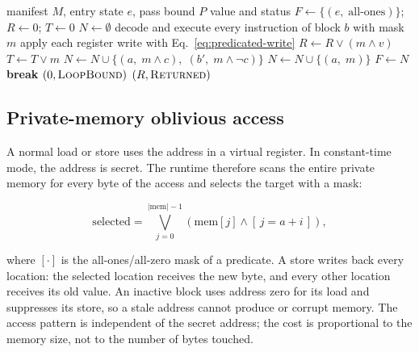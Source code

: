 \begin{algorithm}[htbp]
\caption{Fixed-pass oblivious execution.}
\label{alg:ct}
\begin{algorithmic}[1]
\REQUIRE manifest $M$, entry state $e$, pass bound $P$
\ENSURE value and status
\STATE $F \gets \{(e,\; \text{all-ones})\}$; $R \gets 0$; $T \gets 0$
  \STATE $N \gets \emptyset$
    \STATE decode and execute every instruction of block $b$ with mask $m$
    \STATE apply each register write with Eq.~\eqref{eq:predicated-write}
      \STATE $R \gets R \lor (m \land v)$
      \STATE $T \gets T \lor m$
      \STATE $N \gets N \cup \{(a,\; m \land c),\;(b',\; m \land \lnot c)\}$
      \STATE $N \gets N \cup \{(a,\; m)\}$
    \ENDIF
  \ENDFOR
  \STATE $F \gets N$
    \STATE \textbf{break}
  \ENDIF
\ENDFOR
{}
  \STATE \RETURN $(0,\textsc{LoopBound})$
\ENDIF
\STATE \RETURN $(R,\textsc{Returned})$
\end{algorithmic}
\end{algorithm}

\subsection{Private-memory oblivious access}

A normal load or store uses the address in a virtual register. In constant-time
mode, the address is secret. The runtime therefore scans the entire private
memory for every byte of the access and selects the target with a mask:

\begin{equation}
  \text{selected} = \bigvee_{j=0}^{|\text{mem}|-1} \left( \text{mem}[j] \land
  [\,j = a + i\,] \right),
  \label{eq:oblivious-load}
\end{equation}

where $[\cdot]$ is the all-ones/all-zero mask of a predicate. A store writes back
every location: the selected location receives the new byte, and every other
location receives its old value. An inactive block uses address zero for its load
and suppresses its store, so a stale address cannot produce  or
corrupt memory. The access pattern is independent of the secret address; the cost
is proportional to the memory size, not to the number of bytes touched.

